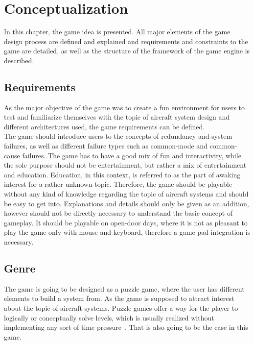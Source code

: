 
\chapter{Conceptualization}\label{ch:design}
In this chapter, the game idea is presented.
All major elements of the game design process are defined and explained and requirements and constraints to the game are detailed, as well as
the structure of the framework of the game engine is described.

\section{Requirements}\label{sec:requirements}
As the major objective of the game was to create a fun environment for users to test and familiarize themselves with the topic of
aircraft system design and different architectures used, the game requirements can be defined.
\\
The game should introduce users to the concepts of redundancy and system failures, as well as different failure types such
as common-mode and common-cause failures.
The game has to have a good mix of fun and interactivity, while the sole purpose should not be entertainment, but rather a
mix of entertainment and education.
Education, in this context, is referred to as the part of awaking interest for a rather unknown topic.
Therefore, the game should be playable without any kind of knowledge regarding the topic of aircraft systems and should be easy
to get into.
Explanations and details should only be given as an addition, however should not be directly necessary to understand the basic concept
of gameplay.
It should be playable on open-door days, where it is not as pleasant to play the game only with mouse and keyboard, therefore a game pad
integration is necessary.

\section{Genre}\label{sec:genre}
The game is going to be designed as a puzzle game, where the user has different elements to build a system from.
As the game is supposed to attract interest about the topic of aircraft systems.
Puzzle games offer a way for the player to logically or conceptually solve levels, which is usually realized without
implementing any sort of time pressure~\cite{10.5555/2544002}.
That is also going to be the case in this game.

